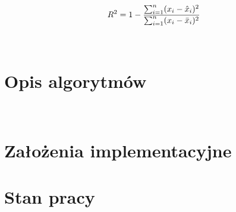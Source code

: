 \documentclass{article}
\begin{document}
        \begin{equation}
            \label{eqn:r2}
            R^{2} =1 - \frac{\sum_{i=1}^n (x_{i}-\hat{x}_{i})^2}{\sum_{i=1}^n (x_{i}-\bar{x}_{i})^2}   \\[2ex]
        \end{equation}
        
         \\[2ex]

\section{Opis algorytmów}
\label{sec:algorytm}
\\






\section{Założenia implementacyjne}
\label{sec:zalozenia}

\section{Stan pracy}





\end{document}

